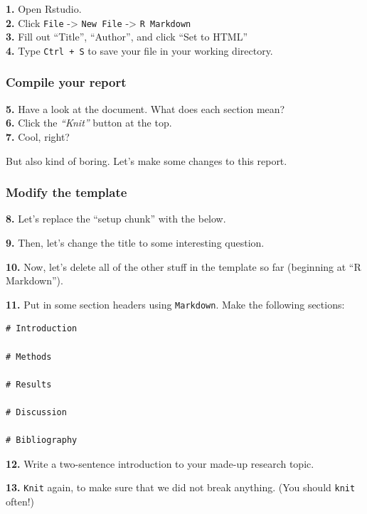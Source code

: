 \documentclass[
]{book}
\begin{document}
\textbf{1.} Open Rstudio.\\
\textbf{2.} Click \texttt{File} -\textgreater{} \texttt{New\ File} -\textgreater{} \texttt{R\ Markdown}\\
\textbf{3.} Fill out ``Title'', ``Author'', and click ``Set to HTML''\\
\textbf{4.} Type \texttt{Ctrl\ +\ S} to save your file in your working directory.

\hypertarget{compile-your-report}{%
\subsubsection*{Compile your report}\label{compile-your-report}}

\textbf{5.} Have a look at the document. What does each section mean?\\
\textbf{6.} Click the \emph{``Knit''} button at the top.\\
\textbf{7.} Cool, right?

But also kind of boring. Let's make some changes to this report.

\hypertarget{modify-the-template}{%
\subsubsection*{Modify the template}\label{modify-the-template}}

\textbf{8.} Let's replace the ``setup chunk'' with the below.

\textbf{9.} Then, let's change the title to some interesting question.

\textbf{10.} Now, let's delete all of the other stuff in the template so far (beginning at ``R Markdown'').

\textbf{11.} Put in some section headers using \texttt{Markdown}. Make the following sections:

\begin{verbatim}
# Introduction

# Methods

# Results

# Discussion

# Bibliography
\end{verbatim}

\textbf{12.} Write a two-sentence introduction to your made-up research topic.

\textbf{13.} \texttt{Knit} again, to make sure that we did not break anything. (You should \texttt{knit} often!)
\end{document}
